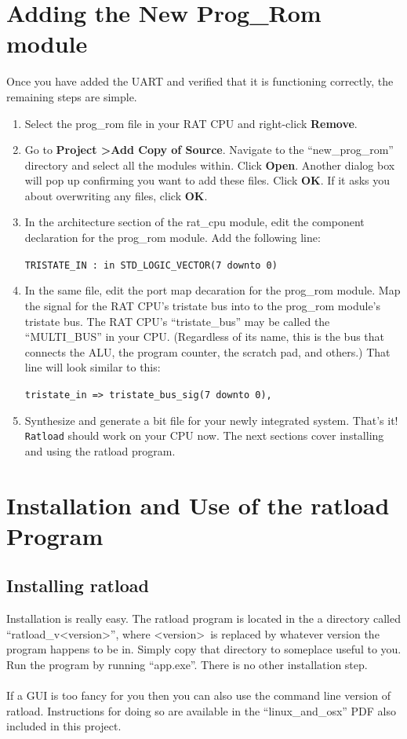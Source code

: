 \documentclass[notitlepage]{article}
\begin{document}
\section{Adding the New Prog\_Rom module}
Once you have added the UART and verified that it is functioning correctly, the remaining steps are simple.
\begin{enumerate}
\item Select the prog\_rom file in your RAT CPU and right-click \textbf{Remove}.

\item Go to \textbf{Project \textgreater Add Copy of Source}. Navigate to the ``new\_prog\_rom'' directory and select all the modules within. Click \textbf{Open}. Another dialog box will pop up confirming you want to add these files. Click \textbf{OK}. If it asks you about overwriting any files, click \textbf{OK}.

\item In the architecture section of the rat\_cpu module, edit the component declaration for the prog\_rom module. Add the following line:\\
  \centerline{\texttt{TRISTATE\_IN : in STD\_LOGIC\_VECTOR(7 downto 0)}}

\item In the same file, edit the port map decaration for the prog\_rom module. Map the signal for the RAT CPU's tristate bus into to the prog\_rom module's tristate bus. The RAT CPU's ``tristate\_bus'' may be called the ``MULTI\_BUS'' in your CPU. (Regardless of its name, this is the bus that connects the ALU, the program counter, the scratch pad, and others.) That line will look similar to this:\\
  \centerline{\texttt{tristate\_in =\textgreater ~tristate\_bus\_sig(7 downto 0),}}

\item Synthesize and generate a bit file for your newly integrated system. That's it! \texttt{Ratload} should work on your CPU now. The next sections cover installing and using the ratload program.
\end{enumerate}

\section{Installation and Use of the ratload Program}
\label{sec:installation}
\subsection{Installing ratload}
Installation is really easy. The ratload program is located in the a directory called ``ratload\_v{\textless}version\textgreater'', where {\textless}version\textgreater~is replaced by whatever version the program happens to be in. Simply copy that directory to someplace useful to you. Run the program by running ``app.exe''. There is no other installation step.\\\\
If a GUI is too fancy for you then you can also use the command line version of ratload. Instructions for doing so are available in the ``linux\_and\_osx'' PDF also included in this project.
\end{document}
